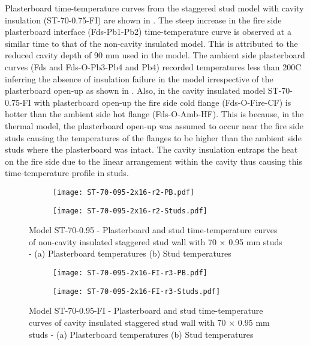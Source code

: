 Plasterboard time-temperature curves from the staggered stud model with cavity insulation (ST-70-0.75-FI) are shown in . The steep increase in the fire side plasterboard interface (Fds-Pb1-Pb2) time-temperature curve is observed at a similar time to that of the non-cavity insulated model. This is attributed to the reduced cavity depth of 90 mm used in the model. The ambient side plasterboard curves (Fds and Fds-O-Pb3-Pb4 and Pb4) recorded temperatures less than 200\degree C inferring the absence of insulation failure in the model irrespective of the plasterboard open-up as shown in . Also, in the cavity insulated model ST-70-0.75-FI with plasterboard open-up the fire side cold flange (Fds-O-Fire-CF) is hotter than the ambient side hot flange (Fds-O-Amb-HF). This is because, in the thermal model, the plasterboard open-up was assumed to occur near the fire side studs causing the temperatures of the flanges to be higher than the ambient side studs where the plasterboard was intact. The cavity insulation entraps the heat on the fire side due to the linear arrangement within the cavity thus causing this time-temperature profile in studs.
\begin{figure}[!htbp]
	\centering
	\begin{subfigure}[b]{0.6\textwidth}
		\centering
		\texttt{[image: ST-70-095-2x16-r2-PB.pdf]}
		\caption{}
		\label{subfig:ST-70-095-2x16-r2-PB}
	\end{subfigure}
	\begin{subfigure}[b]{0.6\textwidth}
		\centering
		\texttt{[image: ST-70-095-2x16-r2-Studs.pdf]}
		\caption{}
		\label{subfig:ST-70-095-2x16-r2-Studs}
	\end{subfigure}
	   \caption{Model ST-70-0.95 - Plasterboard and stud time-temperature curves of non-cavity insulated staggered stud wall with 70 $\times$ 0.95 mm studs - (a) Plasterboard temperatures (b) Stud temperatures}
	   \label{fig:ST-70-095-2x16-r2}
\end{figure}
\begin{figure}[!htbp]
	\centering
	\begin{subfigure}[b]{0.6\textwidth}
		\centering
		\texttt{[image: ST-70-095-2x16-FI-r3-PB.pdf]}
		\caption{}
		\label{subfig:ST-70-095-2x16-FI-r3-PB}
	\end{subfigure}
	\begin{subfigure}[b]{0.6\textwidth}
		\centering
		\texttt{[image: ST-70-095-2x16-FI-r3-Studs.pdf]}
		\caption{}
		\label{subfig:ST-70-095-2x16-FI-r3-Studs}
	\end{subfigure}
	   \caption{Model ST-70-0.95-FI - Plasterboard and stud time-temperature curves of cavity insulated staggered stud wall with 70 $\times$ 0.95 mm studs - (a) Plasterboard temperatures (b) Stud temperatures}
	   \label{fig:ST-70-095-2x16-FI-r3}
\end{figure}

